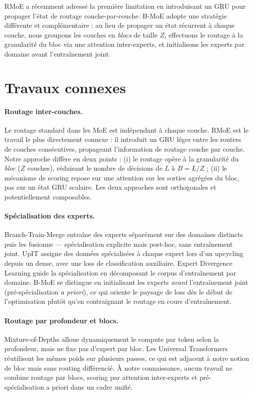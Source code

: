 \documentclass[10pt,a4paper]{article}
\begin{document}
RMoE \cite{qiu2025rmoe} a récemment adressé la première limitation en introduisant un GRU pour propager l'état de routage couche-par-couche. B-MoE adopte une stratégie différente et complémentaire : au lieu de propager un état récurrent à chaque couche, nous groupons les couches en \textit{blocs} de taille $Z$, effectuons le routage à la granularité du bloc via une attention inter-experts, et initialisons les experts par domaine avant l'entraînement joint.

\section{Travaux connexes}

\paragraph{Routage inter-couches.}
Le routage standard dans les MoE \cite{shazeer2017outrageously,fedus2022switch} est indépendant à chaque couche. RMoE \cite{qiu2025rmoe} est le travail le plus directement connexe : il introduit un GRU léger entre les routers de couches consécutives, propageant l'information de routage couche par couche. Notre approche diffère en deux points : (i) le routage opère à la granularité du \textit{bloc} ($Z$ couches), réduisant le nombre de décisions de $L$ à $B = L/Z$ ; (ii) le mécanisme de scoring repose sur une attention sur les sorties agrégées du bloc, pas sur un état GRU scalaire. Les deux approches sont orthogonales et potentiellement composables.

\paragraph{Spécialisation des experts.}
Branch-Train-Merge \cite{li2022btm} entraîne des experts séparément sur des domaines distincts puis les fusionne — spécialisation explicite mais post-hoc, sans entraînement joint. UpIT \cite{upit2025} assigne des données spécialisées à chaque expert lors d'un upcycling depuis un dense, avec une loss de classification auxiliaire. Expert Divergence Learning \cite{edl2026} guide la spécialisation en décomposant le corpus d'entraînement par domaine. B-MoE se distingue en initialisant les experts \textit{avant} l'entraînement joint (pré-spécialisation \textit{a priori}), ce qui oriente le paysage de loss dès le début de l'optimisation plutôt qu'en contraignant le routage en cours d'entraînement.

\paragraph{Routage par profondeur et blocs.}
Mixture-of-Depths \cite{raposo2024mod} alloue dynamiquement le compute par token selon la profondeur, mais ne fixe pas d'expert par bloc. Les Universal Transformers \cite{dehghani2019universal} réutilisent les mêmes poids sur plusieurs passes, ce qui est adjacent à notre notion de bloc mais sans routing différencié. À notre connaissance, aucun travail ne combine routage par blocs, scoring par attention inter-experts et pré-spécialisation a priori dans un cadre unifié.
\end{document}
